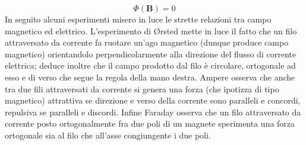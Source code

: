 \documentclass[10pt,a4paper]{article}
\begin{document}
\[\Phi(\mathbf{B}) = 0\] 
In seguito alcuni esperimenti misero in luce le strette relazioni tra campo magnetico ed elettrico. L'esperimento di \O{}rsted mette in luce il fatto che un filo attraversato da corrente fa ruotare un'ago magnetico (dunque produce campo magnetico) orientandolo perpendicolarmente alla direzione del flusso di corrente elettrica; deduce inoltre che il campo prodotto dal filo è circolare, ortogonale ad esso e di verso che segue la regola della mano destra. Ampere osserva che anche tra due fili attraversati da corrente si genera una forza (che ipotizza di tipo magnetico) attrattiva se direzione e verso della corrente sono paralleli e concordi, repulsiva se paralleli e discordi. Infine Faraday osserva che un filo attraversato da corrente posto ortogonalmente fra due poli di un magnete sperimenta una forza ortogonale sia al filo che all'asse congiungente i due poli.\\
\end{document}

